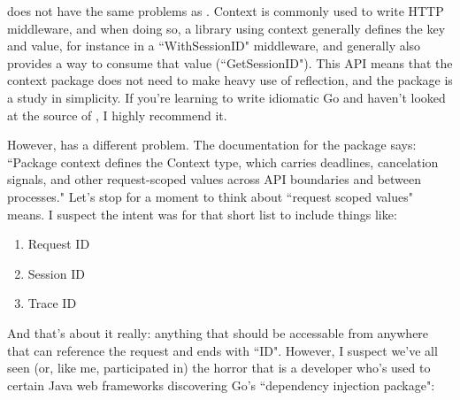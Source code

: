 \documentclass{article}
\begin{document}
 does not have the same problems as .
Context is commonly used to write HTTP middleware, and when doing so, a library
using context generally defines the key and value, for instance in a
``WithSessionID" middleware, and generally also provides a way to consume that
value (``GetSessionID").
This API means that the context package does not need to make heavy use of
reflection, and the package is a study in simplicity.
If you're learning to write idiomatic Go and haven't looked at the source of
, I highly recommend it.

However,  has a different problem.
The documentation for the  package says:
``Package context defines the Context type, which carries deadlines, cancelation
signals, and other request-scoped values across API boundaries and between
processes."
Let's stop for a moment to think about ``request scoped values" means.
I suspect the intent was for that short list to include things like:

\begin{enumerate}
	\item Request ID
	\item Session ID
	\item Trace ID
\end{enumerate}

And that's about it really: anything that should be accessable from anywhere
that can reference the request and ends with ``ID".
However, I suspect we've all seen (or, like me, participated in) the horror that
is a developer who's used to certain Java web frameworks discovering Go's
``dependency injection package":
\end{document}
